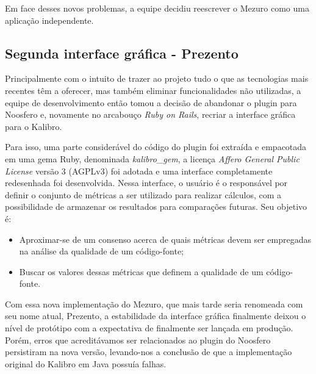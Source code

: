 \documentclass{llncs}
\begin{document}
  Em face desses novos problemas, a equipe decidiu reescrever o Mezuro como uma aplicação independente.

  \subsection{Segunda interface gráfica - Prezento}\label{sec:segundo-prototipo}

  Principalmente com o intuito de trazer ao projeto tudo o que as tecnologias mais recentes têm a oferecer, mas também eliminar funcionalidades não utilizadas, a equipe de desenvolvimento então tomou a decisão de abandonar o plugin para Noosfero e, novamente no arcabouço \textit{Ruby on Rails}, recriar a interface gráfica para o Kalibro.

  Para isso, uma parte considerável do código do plugin foi extraída e empacotada em uma gema Ruby, denominada \textit{kalibro_gem}, a licença \textit{Affero General Public License} versão 3 (AGPLv3) foi adotada e uma interface completamente redesenhada foi desenvolvida. Nessa interface, o usuário é o responsável por definir o conjunto de métricas a ser utilizado para realizar cálculos, com a possibilidade de armazenar os resultados para comparações futuras. Seu objetivo é:

  \begin{itemize}
    \item Aproximar-se de um consenso acerca de quais métricas devem ser empregadas na análise da qualidade de um código-fonte;
    \item Buscar os valores dessas métricas que definem a qualidade de um código-fonte.
  \end{itemize}

  Com essa nova implementação do Mezuro, que mais tarde seria renomeada com seu nome atual, Prezento, a estabilidade da interface gráfica finalmente deixou o nível de protótipo com a expectativa de finalmente ser lançada em produção. Porém, erros que acreditávamos ser relacionados ao plugin do Noosfero persistiram na nova versão, levando-nos a conclusão de que a implementação original do Kalibro em Java possuía falhas.
\end{document}

